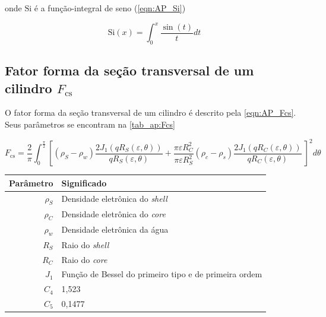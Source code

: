 \begin{apendicesenv}
\noindent onde \(\mathrm{Si}\) é a função-integral de seno (\autoref{eqn:AP_Si})

\begin{equation}
\mathrm{Si}(x) = \int_0^x \frac{\sin (t)}{t}dt
\label{eqn:AP_Si}
\end{equation}

\subsection{Fator forma da seção transversal de um cilindro \(F_{\mathrm{cs}}\)}

O fator forma da seção transversal de um cilindro é descrito pela \autoref{eqn:AP_Fcs}. Seus parâmetros se encontram na \autoref{tab_ap:Fcs}

\begin{equation}
F_{\mathrm{cs}} = \frac{2}{\pi}\int_{0}^{\frac{\pi}{2}}%
%
\left[ \left(\rho_{S} - \rho_{w} \right) \frac{2J_1 \left( qR_{S}\left( \varepsilon,\theta \right) \right)}{qR_{S}\left( \varepsilon,\theta \right)} %
%
+  %
%
\frac{\pi\varepsilon R_C^2}{\pi\varepsilon R_S^2}\left( \rho_c - \rho_s \right)	%
%
\frac{2J_1\left( qR_{C}\left( \varepsilon,\theta \right) \right)}{qR_{C}\left( \varepsilon,\theta \right)}\  \right]^2 d\theta
\label{eqn:AP_Fcs}
\end{equation}


\begin{table}
    {\begin{tabular}{r l}
            \toprule
            Parâmetro 			& Significado \\
            \midrule
            \(\rho_S\)			&  Densidade eletrônica do \emph{shell} \\
            \(\rho_C\)			&  Densidade eletrônica do \emph{core}  \\
            \(\rho_w\)			&  Densidade eletrônica da água			\\
            \(R_S\)			& Raio do \emph{shell} 						\\
            \(R_C\)			& Raio do \emph{core}						\\
            \(J_1\)			&  Função de Bessel do primeiro tipo e de primeira ordem\\
            \(C_4\)			&  1,523	\\
            \(C_5\)			&  0,1477 	\\						
            \bottomrule
        \end{tabular}}%
    {}%
\end{table}


\end{apendicesenv}
